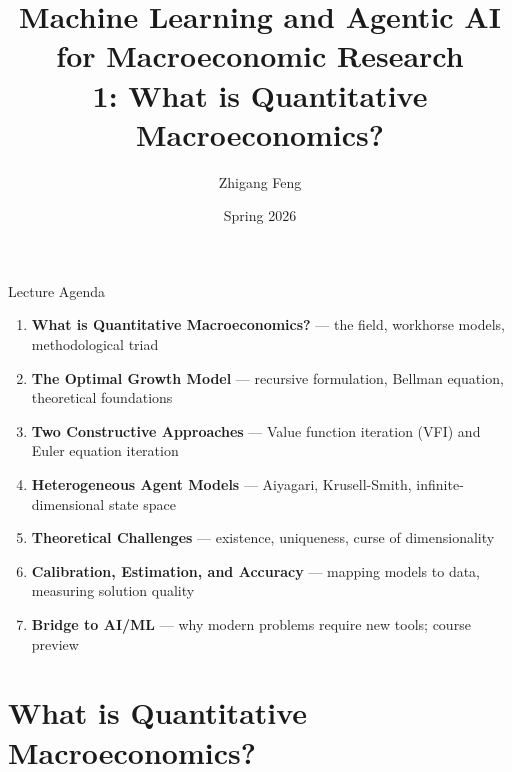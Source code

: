 \documentclass[10pt,english,aspectratio=169]{beamer}
\title[ML \& Agentic AI for Macro Research]{Machine Learning and Agentic AI for Macroeconomic Research\\
1: What is Quantitative Macroeconomics?\\[0.5em]}
\author{Zhigang Feng}
\date{Spring 2026}
\newcommand\makebeamertitle{\frame{\maketitle}}%
\begin{document}
\makebeamertitle


\begin{frame}{Lecture Agenda}
\begin{enumerate}
  \item \textbf{What is Quantitative Macroeconomics?}
    --- the field, workhorse models, methodological triad
  \medskip
  \item \textbf{The Optimal Growth Model}
    --- recursive formulation, Bellman equation, theoretical foundations
  \medskip
  \item \textbf{Two Constructive Approaches}
    --- Value function iteration (VFI) and Euler equation iteration
  \medskip
  \item \textbf{Heterogeneous Agent Models}
    --- Aiyagari, Krusell-Smith, infinite-dimensional state space
  \medskip
  \item \textbf{Theoretical Challenges}
    --- existence, uniqueness, curse of dimensionality
  \medskip
  \item \textbf{Calibration, Estimation, and Accuracy}
    --- mapping models to data, measuring solution quality
  \medskip
  \item \textbf{Bridge to AI/ML}
    --- why modern problems require new tools; course preview
\end{enumerate}
\end{frame}


\section{What is Quantitative Macroeconomics?}
\end{document}
